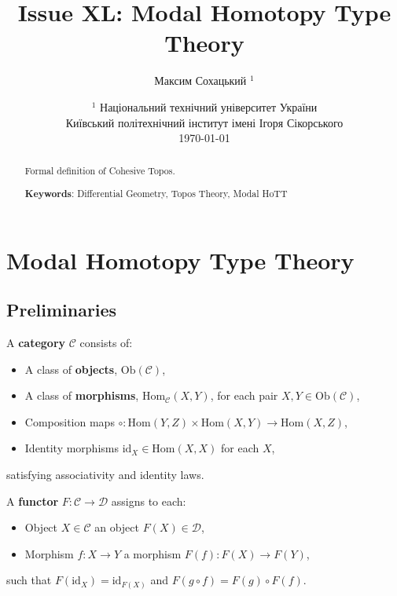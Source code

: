 \documentclass{article}
\begin{document}
\title{Issue XL: Modal Homotopy Type Theory}
\author{Максим Сохацький $^1$}
\date{ $^1$ Національний технічний університет України \\
       \small Київський політехнічний інститут імені Ігоря Сікорського \\
       \today }

\maketitle

\begin{abstract}

Formal definition of Cohesive Topos.

{\bf Keywords}: Differential Geometry, Topos Theory, Modal HoTT \\
\end{abstract}

\ifincludeTOC
  \tableofcontents
\fi

\section{Modal Homotopy Type Theory}

\subsection{Preliminaries}
A \textbf{category} $\mathcal{C}$ consists of:
\begin{itemize}
  \item A class of \textbf{objects}, $\mathrm{Ob}(\mathcal{C})$,
  \item A class of \textbf{morphisms}, $\mathrm{Hom}_{\mathcal{C}}(X,Y)$, for each pair $X,Y \in \mathrm{Ob}(\mathcal{C})$,
  \item Composition maps $\circ: \mathrm{Hom}(Y,Z) \times \mathrm{Hom}(X,Y) \to \mathrm{Hom}(X,Z)$,
  \item Identity morphisms $\mathrm{id}_X \in \mathrm{Hom}(X,X)$ for each $X$,
\end{itemize}
satisfying associativity and identity laws.


A \textbf{functor} $F: \mathcal{C} \to \mathcal{D}$ assigns to each:
\begin{itemize}
  \item Object $X \in \mathcal{C}$ an object $F(X) \in \mathcal{D}$,
  \item Morphism $f: X \to Y$ a morphism $F(f): F(X) \to F(Y)$,
\end{itemize}
such that $F(\mathrm{id}_X) = \mathrm{id}_{F(X)}$ and $F(g \circ f) = F(g) \circ F(f)$.
\end{document}
